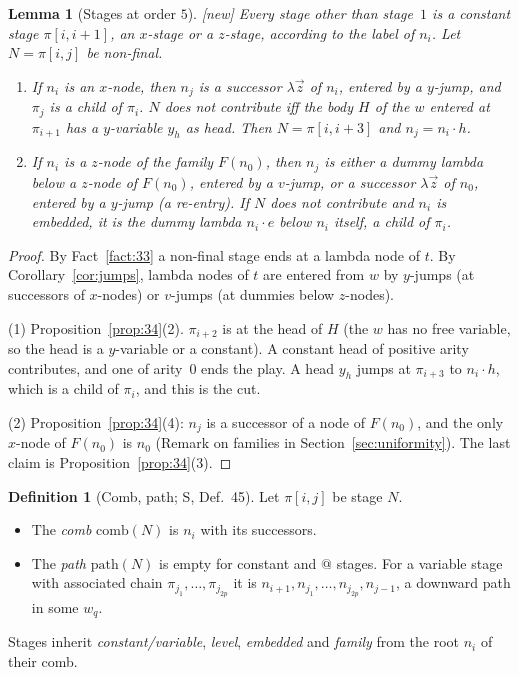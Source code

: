 \documentclass[11pt]{article}
\newcommand{\suc}[2]{#1{\cdot}#2}
\newcommand{\iv}[2]{\pi[#1,#2]}
\newcommand{\comb}{\mathrm{comb}}
\newcommand{\pth}{\mathrm{path}}
\newcommand{\New}{\textsf{[new]}}
\theoremstyle{plain}
\newtheorem{lemma}[theorem]{Lemma}
\theoremstyle{definition}
\newtheorem{definition}[theorem]{Definition}
\theoremstyle{remark}
\begin{document}
\begin{lemma}[Stages at order $5$]\label{lem:stages5}
\New{} Every stage other than stage~$1$ is a \emph{constant stage}
$\iv i{i+1}$, an \emph{$x$-stage} or a \emph{$z$-stage}, according to the
label of $n_i$.  Let $N=\iv ij$ be non-final.
\begin{enumerate}
\item If $n_i$ is an $x$-node, then $n_j$ is a successor $\lambda\vec z$
  of $n_i$, entered by a $y$-jump, and $\pi_j$ is a child of $\pi_i$.
  $N$ does not contribute iff the body $H$ of the $w$ entered at
  $\pi_{i+1}$ has a $y$-variable $y_h$ as head.  Then $N=\iv i{i+3}$ and
  $n_j=\suc{n_i}h$.
\item If $n_i$ is a $z$-node of the family $F(n_0)$, then $n_j$ is
  either a dummy lambda below a $z$-node of $F(n_0)$, entered by a
  $v$-jump, or a successor $\lambda\vec z$ of $n_0$, entered by a
  $y$-jump (a \emph{re-entry}).  If $N$ does not contribute and $n_i$ is
  embedded, it is the dummy lambda $\suc{n_i}e$ below $n_i$ itself, a
  child of $\pi_i$.
\end{enumerate}
\end{lemma}
\begin{proof}
By Fact~\ref{fact:33} a non-final stage ends at a lambda node of $t$.
By Corollary~\ref{cor:jumps}, lambda nodes of $t$ are entered from $w$ by
$y$-jumps (at successors of $x$-nodes) or $v$-jumps (at dummies below
$z$-nodes).

(1) Proposition~\ref{prop:34}(2).  $\pi_{i+2}$ is at the head of $H$
(the $w$ has no free variable, so the head is a $y$-variable or a
constant).  A constant head of positive arity contributes, and one of
arity~$0$ ends the play.  A head $y_h$ jumps at $\pi_{i+3}$ to
$\suc{n_i}h$, which is a child of $\pi_i$, and this is the cut.

(2) Proposition~\ref{prop:34}(4): $n_j$ is a successor of a node of
$F(n_0)$, and the only $x$-node of $F(n_0)$ is $n_0$
(Remark on families in Section~\ref{sec:uniformity}).  The last claim is
Proposition~\ref{prop:34}(3).
\end{proof}

\begin{definition}[Comb, path; S, Def.~45]
Let $\iv ij$ be stage $N$.
\begin{itemize}
\item The \emph{comb} $\comb(N)$ is $n_i$ with its successors.
\item The \emph{path} $\pth(N)$ is empty for constant and $@$ stages.
  For a variable stage with associated chain
  $\pi_{j_1},\dots,\pi_{j_{2p}}$ it is
  $n_{i+1},n_{j_1},\dots,n_{j_{2p}},n_{j-1}$, a downward path in some
  $w_q$.
\end{itemize}
Stages inherit \emph{constant/variable}, \emph{level},
\emph{embedded} and \emph{family} from the root $n_i$ of their comb.
\end{definition}
\end{document}
